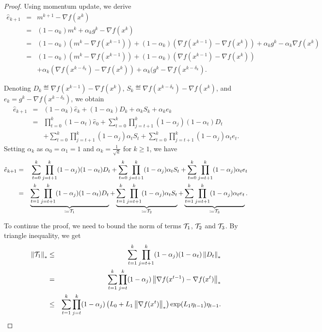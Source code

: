 \documentclass{article}
\begin{document}
\begin{proof}
    Using momentum update, we derive
    \begin{eqnarray*}
        \hat{e}_{k+1} &=& m^{k+1} - \nabla f(x^k)\\
        &=& (1-\alpha_k)m^k +\alpha_k g^k - \nabla f(x^k)\\
        &=& (1-\alpha_k)(m^k- \nabla f(x^{k-1})) + (1-\alpha_k)(\nabla f(x^{k-1}) - \nabla f(x^k)) +\alpha_k g^k - \alpha_k\nabla f(x^k)\\
        &=& (1-\alpha_k)(m^k- \nabla f(x^{k-1})) + (1-\alpha_k)(\nabla f(x^{k-1}) - \nabla f(x^k))\\
        && +\alpha_k (\nabla f(x^{k-\delta_k}) - \nabla f(x^k))  +\alpha_k(g^k - \nabla f(x^{k-\delta_k}).
    \end{eqnarray*}

Denoting $D_k \eqdef   \nabla f(x^{k-1}) - \nabla f(x^k)$, $S_k \eqdef \nabla f(x^{k-\delta_k}) - \nabla f(x^k)$, and $e_k = g^k - \nabla f(x^{k-\delta_k})$, we obtain
\begin{eqnarray*}
    \hat{e}_{k+1} &=& (1-\alpha_k) \hat{e}_{k} + (1-\alpha_k) D_k + \alpha_k S_k +\alpha_k e_k \\
    &=&\prod_{t = 0}^{k}(1-\alpha_t) \hat{e}_{0} + \sum_{t=0}^k \prod_{j=t+1}^{k}(1-\alpha_j)(1-\alpha_t) D_t \\
    && + \sum_{t=0}^k \prod_{j=t+1}^{k}(1-\alpha_j) \alpha_t S_t + \sum_{t=0}^k \prod_{j=t+1}^{k}(1-\alpha_j) \alpha_t e_t.
\end{eqnarray*}
Setting $\alpha_k$ as $\alpha_0 = \alpha_1 =1$ and $\alpha_k = \frac{1}{\sqrt{k}}$ for $k \ge 1$, we have 
\begin{eqnarray*}
    \hat{e}_{k+1} &=& \sum_{t=0}^k \prod_{j=t+1}^{k}(1-\alpha_j)(1-\alpha_t) D_t  + \sum_{t=0}^k \prod_{j=t+1}^{k}(1-\alpha_j) \alpha_t S_t + \sum_{t=0}^k \prod_{j=t+1}^{k}(1-\alpha_j) \alpha_t e_t\\
    &=& \underbrace{\sum_{t=1}^k \prod_{j=t+1}^{k}(1-\alpha_j)(1-\alpha_t) D_t}_{\coloneqq\mathcal{T}_1} + \underbrace{\sum_{t=1}^k \prod_{j=t+1}^{k}(1-\alpha_j) \alpha_t S_t}_{\coloneqq \mathcal{T}_2} + \underbrace{\sum_{t=1}^k \prod_{j=t+1}^{k}(1-\alpha_j) \alpha_t e_t}_{\coloneqq \mathcal{T}_3}.
\end{eqnarray*}

To continue the proof, we need to bound the norm of terms $\mathcal{T}_1$, $\mathcal{T}_2$ and $\mathcal{T}_3$. By triangle inequality, we get 
\begin{eqnarray*}
    \left\| \mathcal{T}_1 \right\|_* &\le& \sum_{t=1}^k \prod_{j=t+1}^{k}(1-\alpha_j)(1-\alpha_t) \left\| D_t \right\|_*\\
    &=& \sum_{t=1}^k \prod_{j=t}^{k}(1-\alpha_j) \left\|  \nabla f(x^{t-1}) - \nabla f(x^t) \right\|_*\\
    &\le& \sum_{t=1}^k \prod_{j=t}^{k}(1-\alpha_j) \left(L_0 + L_1\left\| \nabla f(x^t) \right\|_*\right)\exp(L_1\eta_{t-1})\eta_{t-1}.
\end{eqnarray*}


\end{proof}
\end{document}

